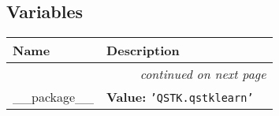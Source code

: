 
  \subsection{Variables}

    \vspace{-1cm}
\hspace{\varindent}\begin{longtable}{|p{\varnamewidth}|p{\vardescrwidth}|l}
\cline{1-2}
\cline{1-2} \centering \textbf{Name} & \centering \textbf{Description}& \\
\cline{1-2}
\endhead\cline{1-2}\multicolumn{3}{r}{\small\textit{continued on next page}}\\\endfoot\cline{1-2}
\endlastfoot\raggedright \_\-\_\-p\-a\-c\-k\-a\-g\-e\-\_\-\_\- & \raggedright \textbf{Value:} 
{\tt \texttt{'}\texttt{QSTK.qstklearn}\texttt{'}}&\\
\cline{1-2}
\end{longtable}

